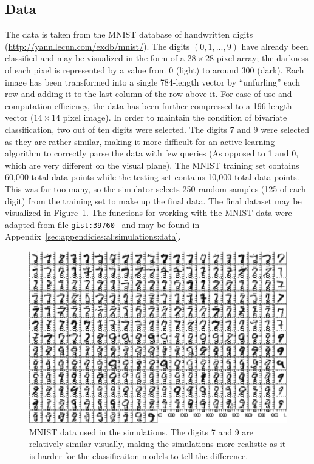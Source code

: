 \subsection{Data}
\label{sec:al:simulation:data}
The data is taken from the MNIST database of handwritten digits 
(\url{http://yann.lecun.com/exdb/mnist/}). The digits $(0,1,...,9)$ have 
already been classified and may be visualized in the form of a $28\times 28$ 
pixel array; the darkness of each pixel is represented by a value from 0 
(light) to around 300 (dark). Each image has been transformed into a single 
784-length vector by ``unfurling'' each row and adding it to the last column of 
the row above it. For ease of use and computation efficiency, the data has been 
further compressed to a 196-length vector ($14\times 14$ pixel image). In order 
to maintain the condition of bivariate classification, two out of ten digits 
were selected. The digits 7 and 9 were selected as they are rather similar, 
making it more difficult for an active learning algorithm to correctly parse 
the data with few queries (As opposed to 1 and 0, which are very different on 
the visual plane). The MNIST training set contains 60,000 total data points 
while the testing set contains 10,000 total data points. This was far too many, 
so the simulator selects 250 random samples (125 of each digit) from the 
training set to make up the final data. The final dataset may be visualized in 
Figure~\ref{fig:al:simulations:data}. The functions for working with the MNIST 
data were adapted from file \texttt{gist:39760}~\cite{oconnor2008} and may be 
found in Appendix~\ref{sec:appendicies:al:simulations:data}.

\begin{figure}[htb]
	\begin{center}
		\includegraphics[width=1\linewidth]{ch-al/figures/data.pdf}
		\caption[MNIST data used in the simulations.]{MNIST data used in the 
		simulations. The digits 7 and 9 are relatively similar visually, making 
		the simulations more realistic as it is harder for the classificaiton 
		models to tell the difference.}
		\label{fig:al:simulations:data}
	\end{center}
\end{figure}

